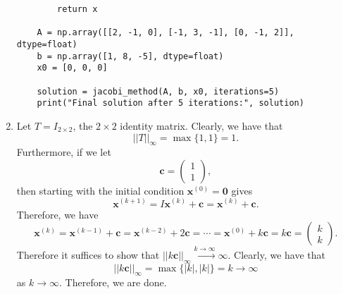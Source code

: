 \documentclass[12pt]{article}
\begin{document}
\begin{enumerate}[leftmargin=0em]
\begin{lstlisting}
        return x

    A = np.array([[2, -1, 0], [-1, 3, -1], [0, -1, 2]], dtype=float)
    b = np.array([1, 8, -5], dtype=float)
    x0 = [0, 0, 0]

    solution = jacobi_method(A, b, x0, iterations=5)
    print("Final solution after 5 iterations:", solution)
    \end{lstlisting}

    \item 
    Let $T=I_{2\times 2}$, the $2\times 2$ identity matrix. Clearly, we have that
    \[{||T||}_{\infty} = \max\{1,1\} = 1.\]
    Furthermore, if we let \[\mathbf{c} = 
    \begin{pmatrix}
        1\\
        1
    \end{pmatrix},\]
    then starting with the initial condition $\mathbf{x}^{(0)} = \mathbf{0}$ gives 
    \[\mathbf{x}^{(k+1)}= I\mathbf{x}^{(k)}+\mathbf{c} = \mathbf{x}^{(k)}+\mathbf{c}.\]
    Therefore, we have
    \[\mathbf{x}^{(k)}= \mathbf{x}^{(k-1)}+\mathbf{c} = \mathbf{x}^{(k-2)}+2\mathbf{c} = \cdots = \mathbf{x}^{(0)}+k\mathbf{c} = k\mathbf{c}= 
    \begin{pmatrix}
        k\\
        k
    \end{pmatrix}.\]
    Therefore it suffices to show that ${||k\mathbf{c}||}_{\infty} \xrightarrow{k\to \infty} \infty$. Clearly, we have that
    \[{||k\mathbf{c}||}_{\infty} = \max\{|k|,|k|\} = k \rightarrow \infty\]
    as $k\rightarrow \infty$. Therefore, we are done.



\end{enumerate}
\end{document}
